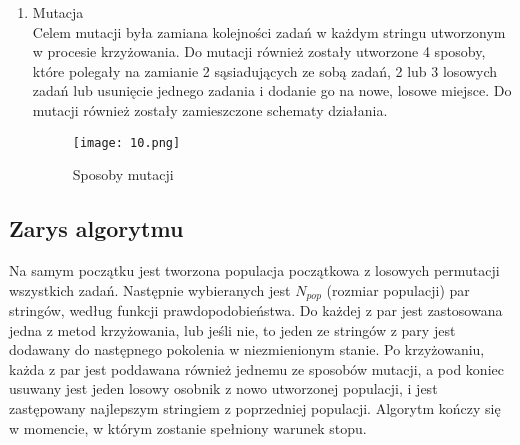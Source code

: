 \documentclass{article}
\begin{document}
\begin{enumerate}
 \item Mutacja\\
 Celem mutacji była zamiana kolejności zadań w każdym stringu utworzonym w procesie krzyżowania. Do mutacji również zostały utworzone 4 sposoby, które polegały na zamianie 2 sąsiadujących ze sobą zadań, 2 lub 3 losowych zadań lub usunięcie jednego zadania i dodanie go na nowe, losowe miejsce. Do mutacji również zostały zamieszczone schematy działania.
 \begin{figure}[H]
 \centering
 \texttt{[image: 10.png]}
 \caption{Sposoby mutacji}
 \end{figure}
 \end{enumerate}

\subsection{Zarys algorytmu}
 Na samym początku jest tworzona populacja początkowa z losowych permutacji wszystkich zadań. Następnie wybieranych jest $N_{pop}$ (rozmiar populacji) par stringów, według funkcji prawdopodobieństwa. Do każdej z par jest zastosowana jedna z metod krzyżowania, lub jeśli nie, to jeden ze stringów z pary jest dodawany do następnego pokolenia w niezmienionym stanie. Po krzyżowaniu, każda z par jest poddawana również jednemu ze sposobów mutacji, a pod koniec usuwany jest jeden losowy osobnik z nowo utworzonej populacji, i  jest zastępowany najlepszym stringiem z poprzedniej populacji. Algorytm kończy się w momencie, w którym zostanie spełniony warunek stopu.
\end{document}
